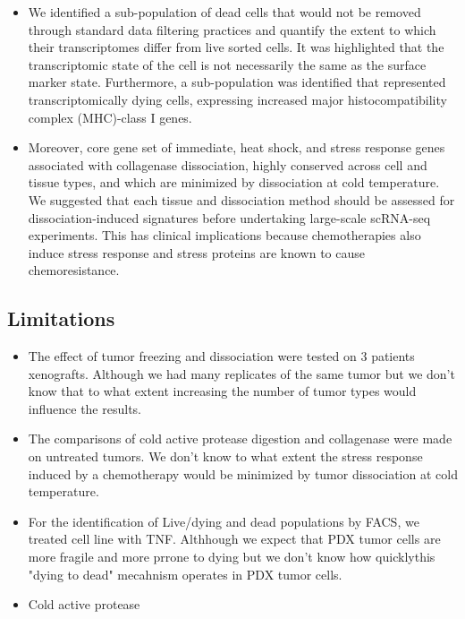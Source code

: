 \begin{itemize}
 \item We identified a sub-population of dead cells that would not be removed through standard data filtering practices and quantify the extent to which their transcriptomes differ from live sorted cells. It was highlighted that the transcriptomic state of the cell is not necessarily the same as the surface marker state. Furthermore, a sub-population was identified that represented transcriptomically dying cells, expressing increased major histocompatibility complex (MHC)-class I genes. 
 
 \item  Moreover, core gene set of immediate, heat shock, and stress response genes associated with collagenase dissociation, highly conserved across cell and tissue types, and which are minimized by dissociation at cold temperature. We suggested that each tissue and dissociation method should be assessed for dissociation-induced signatures before undertaking large-scale scRNA-seq experiments. This has clinical implications because chemotherapies also induce stress response and stress proteins are known to cause chemoresistance.


\end{itemize}

\subsection{Limitations}

\begin{itemize}

\item The effect of tumor freezing and dissociation were tested on 3 patients xenografts. Although we had many replicates of the same tumor but we don't know that to what extent increasing the number of tumor types would influence the results.

\item The comparisons of cold active protease digestion and collagenase were  made on untreated tumors. We don't know to what extent the stress response induced by a chemotherapy would be minimized by tumor dissociation at cold temperature.

\item For the identification of Live/dying and dead populations by FACS, we treated cell line with TNF\textalpha. Althhough we expect that PDX tumor cells are more fragile and more prrone to dying but we don't know how quicklythis "dying to dead" mecahnism operates in PDX tumor cells. 

\item Cold active protease 


\end{itemize}

